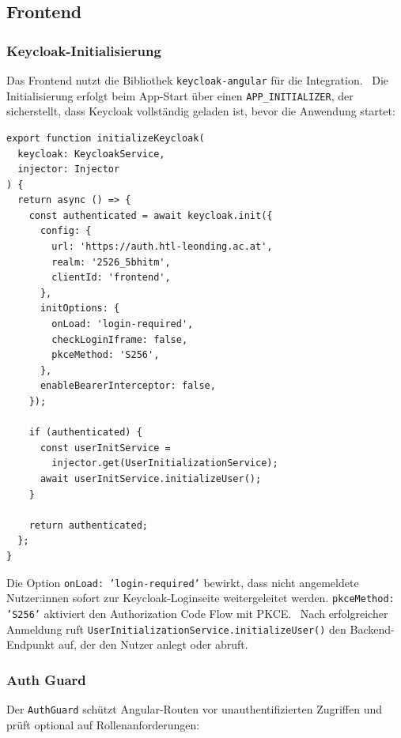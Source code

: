 \subsection{Frontend}

\subsubsection{Keycloak-Initialisierung}

Das Frontend nutzt die Bibliothek \texttt{keycloak-angular} für die
Integration.~\cite{keycloak-docs} Die Initialisierung erfolgt beim
App-Start über einen \texttt{APP\_INITIALIZER}, der sicherstellt,
dass Keycloak vollständig geladen ist, bevor die Anwendung
startet:

\begin{lstlisting}[style=tsstyle,
                   caption={Keycloak-Initialisierung (keycloak.provider.ts)},
                   label={lst:keycloak-init}]
export function initializeKeycloak(
  keycloak: KeycloakService,
  injector: Injector
) {
  return async () => {
    const authenticated = await keycloak.init({
      config: {
        url: 'https://auth.htl-leonding.ac.at',
        realm: '2526_5bhitm',
        clientId: 'frontend',
      },
      initOptions: {
        onLoad: 'login-required',
        checkLoginIframe: false,
        pkceMethod: 'S256',
      },
      enableBearerInterceptor: false,
    });

    if (authenticated) {
      const userInitService =
        injector.get(UserInitializationService);
      await userInitService.initializeUser();
    }

    return authenticated;
  };
}
\end{lstlisting}

Die Option \texttt{onLoad: 'login-required'} bewirkt, dass nicht
angemeldete Nutzer:innen sofort zur Keycloak-Loginseite
weitergeleitet werden. \texttt{pkceMethod: 'S256'} aktiviert den
Authorization Code Flow mit PKCE.~\cite{oauth2-rfc} Nach erfolgreicher
Anmeldung ruft \texttt{UserInitializationService.initializeUser()}
den Backend-Endpunkt auf, der den Nutzer anlegt oder abruft.

\subsubsection{Auth Guard}

Der \texttt{AuthGuard} schützt Angular-Routen vor unauthentifizierten
Zugriffen und prüft optional auf Rollenanforderungen:

